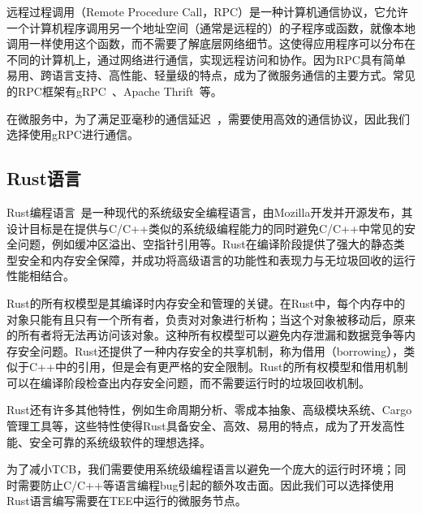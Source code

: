 远程过程调用（Remote Procedure Call，RPC）是一种计算机通信协议，它允许一个计算机程序调用另一个地址空间（通常是远程的）的子程序或函数，就像本地调用一样使用这个函数，而不需要了解底层网络细节。这使得应用程序可以分布在不同的计算机上，通过网络进行通信，实现远程访问和协作。因为RPC具有简单易用、跨语言支持、高性能、轻量级的特点，成为了微服务通信的主要方式。常见的RPC框架有gRPC~\cite{}、Apache Thrift~\cite{}等。

在微服务中，为了满足亚毫秒的通信延迟~\cite{}，需要使用高效的通信协议，因此我们选择使用gRPC进行通信。

\subsection{Rust语言}

Rust编程语言~\cite{}是一种现代的系统级安全编程语言，由Mozilla开发并开源发布，其设计目标是在提供与C/C++类似的系统级编程能力的同时避免C/C++中常见的安全问题，例如缓冲区溢出、空指针引用等。Rust在编译阶段提供了强大的静态类型安全和内存安全保障，并成功将高级语言的功能性和表现力与无垃圾回收的运行性能相结合。

Rust的所有权模型是其编译时内存安全和管理的关键。在Rust中，每个内存中的对象只能有且只有一个所有者，负责对对象进行析构；当这个对象被移动后，原来的所有者将无法再访问该对象。这种所有权模型可以避免内存泄漏和数据竞争等内存安全问题。Rust还提供了一种内存安全的共享机制，称为借用（borrowing），类似于C++中的引用，但是会有更严格的安全限制。Rust的所有权模型和借用机制可以在编译阶段检查出内存安全问题，而不需要运行时的垃圾回收机制。

Rust还有许多其他特性，例如生命周期分析、零成本抽象、高级模块系统、Cargo管理工具等，这些特性使得Rust具备安全、高效、易用的特点，成为了开发高性能、安全可靠的系统级软件的理想选择。

为了减小TCB，我们需要使用系统级编程语言以避免一个庞大的运行时环境；同时需要防止C/C++等语言编程bug引起的额外攻击面。因此我们可以选择使用Rust语言编写需要在TEE中运行的微服务节点。
